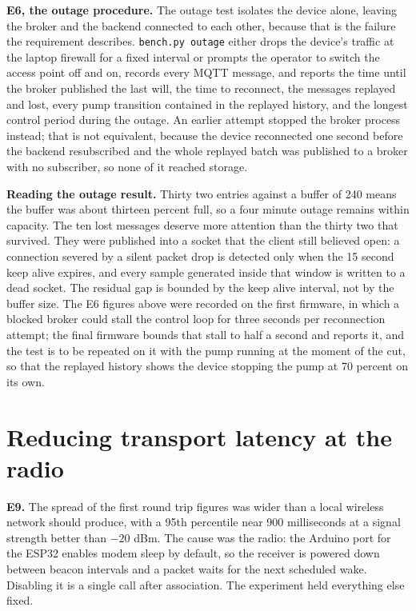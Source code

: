 \textbf{E6, the outage procedure.} The outage test isolates the device alone, leaving the broker and the backend connected to each other, because that is the failure the requirement describes. \texttt{bench.py outage} either drops the device's traffic at the laptop firewall for a fixed interval or prompts the operator to switch the access point off and on, records every MQTT message, and reports the time until the broker published the last will, the time to reconnect, the messages replayed and lost, every pump transition contained in the replayed history, and the longest control period during the outage. An earlier attempt stopped the broker process instead; that is not equivalent, because the device reconnected one second before the backend resubscribed and the whole replayed batch was published to a broker with no subscriber, so none of it reached storage.

\textbf{Reading the outage result.} Thirty two entries against a buffer of 240 means the buffer was about thirteen percent full, so a four minute outage remains within capacity. The ten lost messages deserve more attention than the thirty two that survived. They were published into a socket that the client still believed open: a connection severed by a silent packet drop is detected only when the 15 second keep alive expires, and every sample generated inside that window is written to a dead socket. The residual gap is bounded by the keep alive interval, not by the buffer size. The E6 figures above were recorded on the first firmware, in which a blocked broker could stall the control loop for three seconds per reconnection attempt; the final firmware bounds that stall to half a second and reports it, and the test is to be repeated on it with the pump running at the moment of the cut, so that the replayed history shows the device stopping the pump at 70 percent on its own.

\section{Reducing transport latency at the radio}

\textbf{E9.} The spread of the first round trip figures was wider than a local wireless network should produce, with a 95th percentile near 900 milliseconds at a signal strength better than $-20$ dBm. The cause was the radio: the Arduino port for the ESP32 enables modem sleep by default, so the receiver is powered down between beacon intervals and a packet waits for the next scheduled wake. Disabling it is a single call after association. The experiment held everything else fixed.

